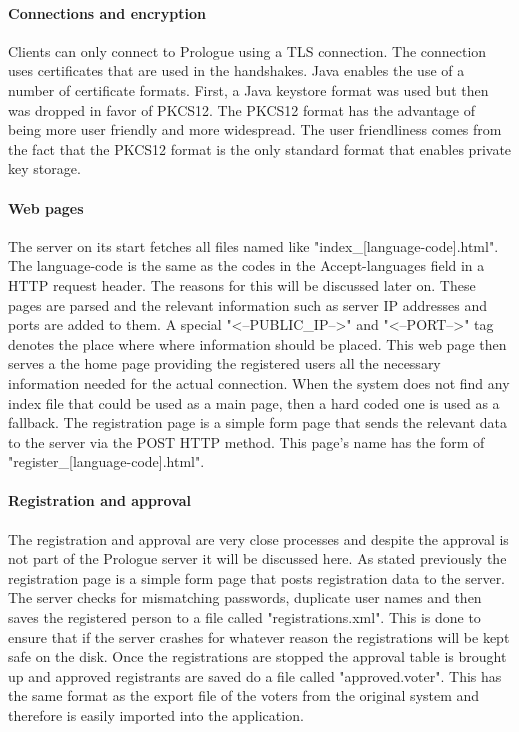 \documentclass[11pt,twoside,a4paper]{book}
\begin{document}
\paragraph{Connections and encryption}
Clients can only connect to Prologue using a TLS\cite{tls} connection. The connection uses certificates that are used in the handshakes. Java enables the use of a number of certificate formats. First, a Java keystore format was used but then was dropped in favor of PKCS12\cite{pkcs12}. The PKCS12 format has the advantage of being more user friendly and more widespread. The user friendliness comes from the fact that the PKCS12 format is the only standard format that enables private key storage.
\paragraph{Web pages}
The server on its start fetches all files named like "index_[language-code].html". The language-code is the same as the codes in the Accept-languages\cite{httpHead} field in a HTTP request header. The reasons for this will be discussed later on. These pages are parsed and the relevant information such as server IP addresses and ports are added to them. A special "<--PUBLIC_IP-->" and "<--PORT-->" tag denotes the place where where information should be placed.  This web page then serves a the home page providing the registered users all the necessary information needed for the actual connection. When the system does not find any index file that could be used as a main page, then a hard coded one is used as a fallback. The registration page is a simple form page that sends the relevant data to the server via the POST HTTP method. This page's name has the form of "register_[language-code].html".
\paragraph{Registration and approval}
The registration and approval are very close processes and despite the approval is not part of the Prologue server it will be discussed here. As stated previously the registration page is a simple form page that posts registration data to the server. The server checks for mismatching passwords, duplicate user names and then saves the registered person to a file called "registrations.xml". This is done to ensure that if the server crashes for whatever reason the registrations will be kept safe on the disk. Once the registrations are stopped the approval table is brought up and approved registrants are saved do a file called "approved.voter". This has the same format as the export file of the voters from the original system and therefore is easily imported into the application.
\end{document}

